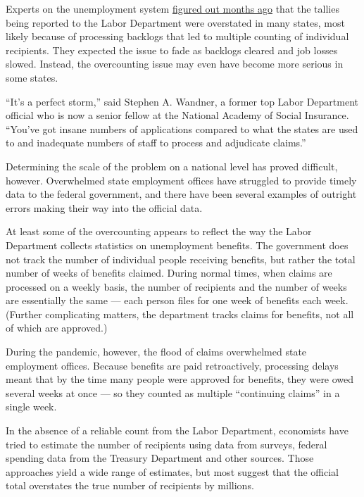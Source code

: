 Experts on the unemployment system
\href{https://www.bloomberg.com/news/articles/2020-06-29/u-s-jobless-claims-figures-inflated-by-states-backlog-clearing?srnd=premium\&sref=vuYGislZ}{figured
out months ago} that the tallies being reported to the Labor Department
were overstated in many states, most likely because of processing
backlogs that led to multiple counting of individual recipients. They
expected the issue to fade as backlogs cleared and job losses slowed.
Instead, the overcounting issue may even have become more serious in
some states.

``It's a perfect storm,'' said Stephen A. Wandner, a former top Labor
Department official who is now a senior fellow at the National Academy
of Social Insurance. ``You've got insane numbers of applications
compared to what the states are used to and inadequate numbers of staff
to process and adjudicate claims.''

Determining the scale of the problem on a national level has proved
difficult, however. Overwhelmed state employment offices have struggled
to provide timely data to the federal government, and there have been
several examples of outright errors making their way into the official
data.

At least some of the overcounting appears to reflect the way the Labor
Department collects statistics on unemployment benefits. The government
does not track the number of individual people receiving benefits, but
rather the total number of weeks of benefits claimed. During normal
times, when claims are processed on a weekly basis, the number of
recipients and the number of weeks are essentially the same --- each
person files for one week of benefits each week. (Further complicating
matters, the department tracks claims for benefits, not all of which are
approved.)

During the pandemic, however, the flood of claims overwhelmed state
employment offices. Because benefits are paid retroactively, processing
delays meant that by the time many people were approved for benefits,
they were owed several weeks at once --- so they counted as multiple
``continuing claims'' in a single week.

In the absence of a reliable count from the Labor Department, economists
have tried to estimate the number of recipients using data from surveys,
federal spending data from the Treasury Department and other sources.
Those approaches yield a wide range of estimates, but most suggest that
the official total overstates the true number of recipients by millions.

